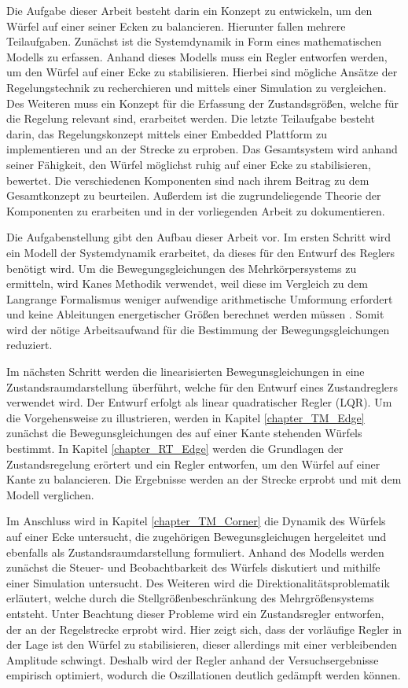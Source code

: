 Die Aufgabe dieser Arbeit besteht darin ein Konzept zu entwickeln, um den Würfel auf einer seiner Ecken zu balancieren. Hierunter fallen mehrere Teilaufgaben. Zunächst ist die Systemdynamik in Form eines mathematischen Modells zu erfassen. Anhand dieses Modells muss ein Regler entworfen werden, um den Würfel auf einer Ecke zu stabilisieren. Hierbei sind mögliche Ansätze der Regelungstechnik zu recherchieren und mittels einer Simulation zu vergleichen. Des Weiteren muss ein Konzept für die Erfassung der Zustandsgrößen, welche für die Regelung relevant sind, erarbeitet werden. Die letzte Teilaufgabe besteht darin, das Regelungskonzept mittels einer Embedded Plattform zu implementieren und an der Strecke zu erproben. Das Gesamtsystem wird anhand seiner Fähigkeit, den Würfel möglichst ruhig auf einer Ecke zu stabilisieren, bewertet. Die verschiedenen Komponenten sind nach ihrem Beitrag zu dem Gesamtkonzept zu beurteilen. Außerdem ist die zugrundeliegende Theorie der Komponenten zu erarbeiten und in der vorliegenden Arbeit zu dokumentieren.

Die Aufgabenstellung gibt den Aufbau dieser Arbeit vor. Im ersten Schritt wird ein Modell der Systemdynamik erarbeitet, da dieses für den Entwurf des Reglers benötigt wird. Um die Bewegungsgleichungen des Mehrkörpersystems zu ermitteln, wird Kanes Methodik \cite{KaneBook} verwendet, weil diese im Vergleich zu dem Langrange Formalismus weniger aufwendige arithmetische Umformung erfordert und keine Ableitungen energetischer Größen berechnet werden müssen \cite[S. 61 ff.]{Zetina}. Somit wird der nötige Arbeitsaufwand für die Bestimmung der Bewegungsgleichungen reduziert.

Im nächsten Schritt werden die linearisierten Bewegunsgleichungen in eine Zustandsraumdarstellung überführt, welche für den Entwurf eines Zustandreglers verwendet wird. Der Entwurf erfolgt als linear quadratischer Regler (LQR). Um die Vorgehensweise zu illustrieren, werden in  Kapitel \ref{chapter_TM_Edge} zunächst die Bewegunsgleichungen des auf einer Kante stehenden Würfels bestimmt. In Kapitel \ref{chapter_RT_Edge} werden die Grundlagen der Zustandsregelung erörtert und ein Regler entworfen, um den Würfel auf einer Kante zu balancieren. Die Ergebnisse werden an der Strecke erprobt und mit dem Modell verglichen.

Im Anschluss wird in Kapitel \ref{chapter_TM_Corner} die Dynamik des Würfels auf einer Ecke untersucht, die zugehörigen Bewegunsgleichugen hergeleitet und ebenfalls als Zustandsraumdarstellung formuliert. Anhand des Modells werden zunächst die Steuer- und Beobachtbarkeit des Würfels diskutiert und mithilfe einer Simulation untersucht. Des Weiteren wird die Direktionalitätsproblematik erläutert, welche durch die Stellgrößenbeschränkung des Mehrgrößensystems entsteht. Unter Beachtung dieser Probleme wird ein Zustandsregler entworfen, der an der Regelstrecke erprobt wird. Hier zeigt sich, dass der vorläufige Regler in der Lage ist den Würfel zu stabilisieren, dieser allerdings mit einer verbleibenden Amplitude schwingt. Deshalb wird der Regler anhand der Versuchsergebnisse empirisch optimiert, wodurch die Oszillationen deutlich gedämpft werden können.

